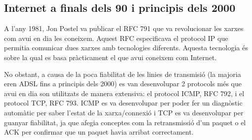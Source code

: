 \subsection{Internet a finals dels 90 i principis dels 2000}
{
    A l'any 1981, Jon Postel va publicar el \ac{RFC} 791 que va revolucionar les xarxes com avui en dia les coneixem.
    Aquest RFC especificava el protocol IP que permitia comunicar dues xarxes amb tecnologies diferents. Aquesta tecnologia
    és sobre la qual es basa pràcticament el que avui coneixem com Internet.
    
    No obstant, a causa de la poca fiabilitat de les linies de transmisió (la majoria eren \ac{ADSL} fins a principis dels 2000) es van
    desenvolupar 2 protocols més que avui en dia son utilitzats de manera extensiva: el protocol \ac{ICMP}, RFC 792, i
    el protocol TCP, RFC 793. ICMP es va desenvolupar per poder fer un diagnòstic automàtic per saber l'estat de la xarxa/connexió i \ac{TCP}
    es va desenvolupar per guanyar fiabilitat, ja que afegia conceptes com la retransmissió d'un paquet o el \ac{ACK} per confirmar que 
    un paquet havia arribat correctament.
}

